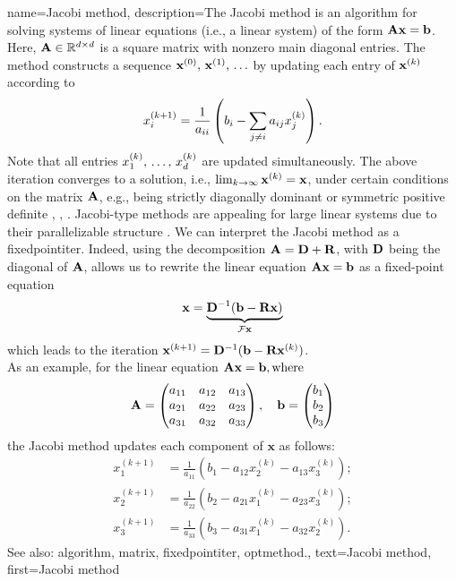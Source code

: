 {name={Jacobi method},
	description={The Jacobi method is an \gls{algorithm}  
		for solving systems of linear equations (i.e., a linear system) of the form ${\bf A}{\bf x}= \mathbf{b}$.  
		Here, ${\bf A} \in \mathbb{R}^{d \times d}$ is a square \gls{matrix} with 
		nonzero main diagonal entries. The method constructs a sequence ${\bf x}^{(0)}, \,{\bf x}^{(1)}, \,\ldots$ 
		by updating each entry of $\mathbf{x}^{(k)}$ according to 
		\[
		x_i^{(k+1)} = \frac{1}{a_{ii}} \left( b_i - \sum_{j \neq i} a_{ij} x_j^{(k)} \right).
		\]
		Note that all entries $x^{(k)}_{1}, \,\ldots, \,x^{(k)}_{d}$ are updated simultaneously.
		The above iteration converges to a solution, i.e., $\lim_{k \rightarrow \infty} {\bf x}^{(k)}={\bf x}$, 
		under certain conditions on the \gls{matrix} ${\bf A}$, e.g., being strictly 
		diagonally dominant or symmetric positive  definite \cite{GolubVanLoanBook}, \cite{StrangLinAlg2016}, \cite{Horn91}. 
		Jacobi-type methods are appealing for large linear systems due to their parallelizable structure \cite{ParallelDistrBook}.
		We can interpret the Jacobi method as a \gls{fixedpointiter}. Indeed, using the decomposition ${\bf A} = {\bf D} + {\bf R}$, with ${\bf D}$ being the 
		diagonal of ${\bf A}$, allows us to rewrite the linear equation ${\bf A} {\bf x} = {\bf b}$ as a fixed-point equation  
		\[
		\mathbf{x} = \underbrace{{\bf D}^{-1}(\mathbf{b} - {\bf R} \mathbf{x})}_{\mathcal{F} {\bf x}}
		\]
		which leads to the iteration ${\bf x}^{(k+1)} = {\bf D}^{-1}(\mathbf{b} - {\bf R} {\bf x}^{(k)})$.
		\\
		As an example, for the linear equation ${\bf A} \mathbf{x} = \mathbf{b}, \text{where}$
		 \[
		 {\bf A} = \begin{pmatrix}
		 	a_{11} & a_{12} & a_{13} \\
		 	a_{21} & a_{22} & a_{23} \\
		 	a_{31} & a_{32} & a_{33}
		 \end{pmatrix}, \quad
		 \mathbf{b} = \begin{pmatrix}
		 	b_1 \\
		 	b_2 \\
		 	b_3
		 \end{pmatrix}
		 \]
		 the Jacobi method updates each component of \( \mathbf{x} \) as follows:
		 \[
		 \begin{aligned}
		 	x_1^{(k+1)} &= \frac{1}{a_{11}} \left( b_1 - a_{12} x_2^{(k)} - a_{13} x_3^{(k)} \right); \\
		 	x_2^{(k+1)} &= \frac{1}{a_{22}} \left( b_2 - a_{21} x_1^{(k)} - a_{23} x_3^{(k)} \right); \\
		 	x_3^{(k+1)} &= \frac{1}{a_{33}} \left( b_3 - a_{31} x_1^{(k)} - a_{32} x_2^{(k)} \right).
		 \end{aligned}
		 \]
		See also: \gls{algorithm}, \gls{matrix}, \gls{fixedpointiter}, \gls{optmethod}.},
	text={Jacobi method}, 
	first={Jacobi method}
}
	
